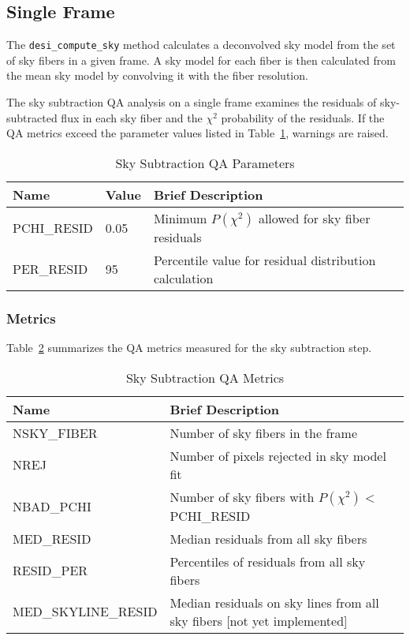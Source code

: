 \documentclass[12pt]{article}
\begin{document}
\subsection{Single Frame}

The {\tt desi\_compute\_sky} method calculates a 
deconvolved sky model
from the set of sky fibers in a given frame.
A sky model for each fiber is then calculated from the 
mean sky model by convolving it with the fiber resolution.

The sky subtraction QA analysis on a single 
frame examines the residuals of sky-subtracted flux in each sky fiber
and the $\chi^2$ probability of the residuals.
If the QA metrics exceed the 
parameter values listed in Table~\ref{tab:sky_param},
warnings are raised.

\begin{table}[h]
\begin{center}
\caption{Sky Subtraction QA Parameters}
\label{tab:sky_param}
\begin{tabular}{p{3.5cm}p{1.2cm}p{8.3cm}}
\hline
{\bf Name} & {\bf Value} & {\bf Brief Description}\\
\hline
PCHI\_RESID    & 0.05 & Minimum $P(\chi^2)$ allowed for sky fiber residuals \\ 
PER\_RESID     & 95   & Percentile value for residual distribution calculation\\
\hline
\end{tabular}
\end{center}
\end{table}

\subsubsection{Metrics}

Table~\ref{tab:sky_metrics} summarizes the QA metrics measured
for the sky subtraction step.  

\begin{table}[h]
\begin{center}
\caption{Sky Subtraction QA Metrics}
\label{tab:sky_metrics}
\begin{tabular}{p{4.3cm}p{9.0cm}}
\hline
{\bf Name} & {\bf Brief Description}\\
\hline
NSKY\_FIBER           & Number of sky fibers in the frame \\
NREJ                  & Number of pixels rejected in sky model fit \\
NBAD\_PCHI            & Number of sky fibers with $P(\chi^2) < $PCHI\_RESID \\
MED\_RESID            & Median residuals from all sky fibers \\
RESID\_PER            & Percentiles of residuals from all sky fibers \\
MED\_SKYLINE\_RESID   & Median residuals on sky lines from all sky fibers [not yet implemented]\\
\hline
\end{tabular}
\end{center}
\end{table}
\end{document}
